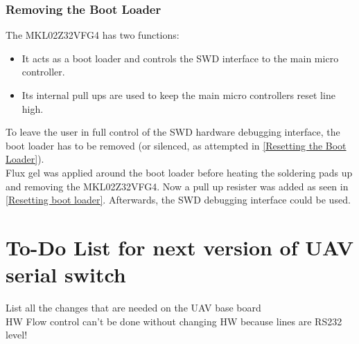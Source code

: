 \subsubsection{Removing the Boot Loader}
The MKL02Z32VFG4 has two functions:
\begin{itemize}
    \item It acts as a boot loader and controls the SWD interface to the main micro controller.
    \item Its internal pull ups are used to keep the main micro controllers reset line high.
\end{itemize}
To leave the user in full control of the SWD hardware debugging interface, the boot loader has to be removed (or silenced, as attempted in \ref{Resetting the Boot Loader}). \\
Flux gel was applied around the boot loader before heating the soldering pads up and removing the MKL02Z32VFG4. Now a pull up resister was added as seen in \autoref{Resetting boot loader}. Afterwards, the SWD debugging interface could be used. \\
%
%
%
%
%
%
%
\section{To-Do List for next version of UAV serial switch}%
List all the changes that are needed on the UAV base board\\
HW Flow control can't be done without changing HW because lines are RS232 level!